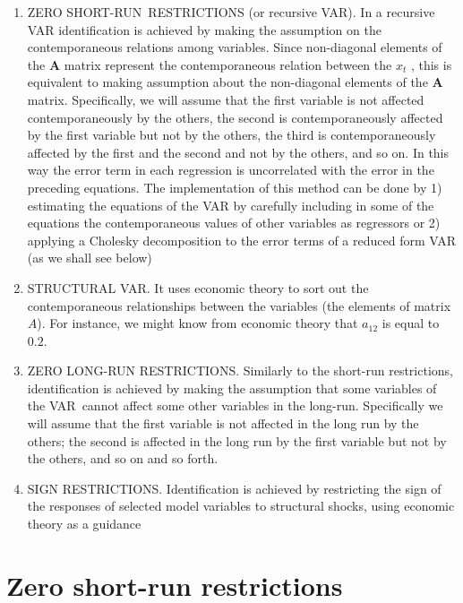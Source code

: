\documentclass[11pt,a4paper]{report}
\numberwithin{equation}{chapter}
\numberwithin{section}{chapter}
\begin{document}
\begin{enumerate}
\item ZERO SHORT-RUN\ RESTRICTIONS (or recursive VAR). In a recursive VAR
identification is achieved by making the assumption on the contemporaneous
relations among variables. Since non-diagonal elements of the $\mathbf{A}$
matrix represent the contemporaneous relation between the \textbf{$x$}$_{t}$%
, this is equivalent to making assumption about the non-diagonal elements of
the $\mathbf{A}$ matrix. Specifically, we will assume that the first
variable is not affected contemporaneously by the others, the second is
contemporaneously affected by the first variable but not by the others, the
third is contemporaneously affected by the first and the second and not by
the others, and so on. In this way the error term in each regression is
uncorrelated with the error in the preceding equations. The implementation
of this method can be done by 1) estimating the equations of the VAR by
carefully including in some of the equations the contemporaneous values of
other variables as regressors or 2) applying a Cholesky decomposition to the
error terms of a reduced form VAR (as we shall see below)

\item STRUCTURAL VAR. It uses economic theory to sort out the
contemporaneous relationships between the variables (the elements of matrix $%
A$). For instance, we might know from economic theory that $a_{12}$ is equal
to $0.2$.

\item ZERO LONG-RUN RESTRICTIONS. Similarly to the short-run restrictions,
identification is achieved by making the assumption that some variables of
the VAR\ cannot affect some other variables in the long-run. Specifically we
will assume that the first variable is not affected in the long run by the
others; the second is affected in the long run by the first variable but not
by the others, and so on and so forth.

\item SIGN RESTRICTIONS. Identification is achieved by restricting the sign
of the responses of selected model variables to structural shocks, using
economic theory as a guidance
\end{enumerate}

\section{Zero short-run restrictions}
\end{document}

